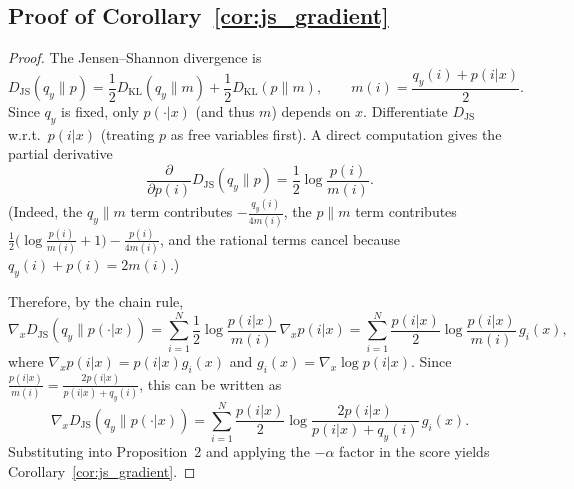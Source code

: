 \documentclass{article}
\begin{document}
\subsection{Proof of Corollary~\ref{cor:js_gradient}}
\label{app:proof_js}
\begin{proof}
The Jensen--Shannon divergence is
\begin{equation}
D_{\mathrm{JS}}(q_y\|p)
=
\frac{1}{2}D_{\mathrm{KL}}(q_y\|m)+\frac{1}{2}D_{\mathrm{KL}}(p\|m),
\qquad
m(i)=\frac{q_y(i)+p(i|x)}{2}.
\end{equation}
Since $q_y$ is fixed, only $p(\cdot|x)$ (and thus $m$) depends on $x$.
Differentiate $D_{\mathrm{JS}}$ w.r.t.\ $p(i|x)$ (treating $p$ as free variables first).
A direct computation gives the partial derivative
\begin{equation}
\frac{\partial}{\partial p(i)} D_{\mathrm{JS}}(q_y\|p)
=
\frac{1}{2}\log\frac{p(i)}{m(i)}.
\end{equation}
(Indeed, the $q_y\|m$ term contributes $-\frac{q_y(i)}{4m(i)}$,
the $p\|m$ term contributes $\frac{1}{2}\big(\log\frac{p(i)}{m(i)}+1\big)-\frac{p(i)}{4m(i)}$,
and the rational terms cancel because $q_y(i)+p(i)=2m(i)$.)

Therefore, by the chain rule,
\begin{equation}
\nabla_x D_{\mathrm{JS}}(q_y\|p(\cdot|x))
=
\sum_{i=1}^N \frac{1}{2}\log\frac{p(i|x)}{m(i)}\, \nabla_x p(i|x)
=
\sum_{i=1}^N \frac{p(i|x)}{2}\log\frac{p(i|x)}{m(i)}\, g_i(x),
\end{equation}
where $\nabla_x p(i|x)=p(i|x)g_i(x)$ and $g_i(x)=\nabla_x\log p(i|x)$.
Since $\frac{p(i|x)}{m(i)}=\frac{2p(i|x)}{p(i|x)+q_y(i)}$, this can be written as
\begin{equation}
\nabla_x D_{\mathrm{JS}}(q_y\|p(\cdot|x))
=
\sum_{i=1}^N \frac{p(i|x)}{2}\log\frac{2p(i|x)}{p(i|x)+q_y(i)}\, g_i(x).
\end{equation}
Substituting into Proposition~2 and applying the $-\alpha$ factor in the score yields Corollary~\ref{cor:js_gradient}.
\end{proof}
\end{document}
